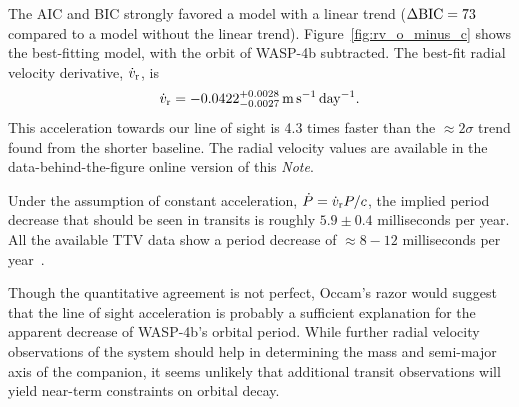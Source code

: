 \documentclass[RNAAS]{aastex62}
\begin{document}
The AIC and BIC strongly favored a model with a linear trend ($\Delta
{\rm BIC}=73$ compared to a model without the linear trend).
Figure~\ref{fig:rv_o_minus_c} shows the best-fitting model, with the
orbit of WASP-4b subtracted.  The best-fit radial velocity derivative,
$\dot{v}_{\rm r}$, is
\begin{equation}
  \dot{v}_{\rm r} = -0.0422^{+0.0028}_{-0.0027}\,{\rm m\,s^{-1}\,day^{-1}}.
\end{equation}
This acceleration towards our line of sight is 4.3 times faster than
the $\approx$$2\sigma$ trend \citet{knutson_friends_2014}
found from the shorter baseline.  The radial velocity values are
available in the data-behind-the-figure online version of this {\it
Note}.

Under the assumption of constant acceleration, $\dot{P} = \dot{v}_{\rm
r} P / c$, the implied period decrease that should be seen in
transits is roughly $5.9 \pm 0.4$ milliseconds per year.  All the
available TTV data show a period decrease of $\approx 8-12$
milliseconds per year~\citep{bouma_wasp-4b_2019,southworth_transit_2019,baluev_homogeneously_2019}.

Though the quantitative agreement is not perfect, Occam's razor would
suggest that the line of sight acceleration is probably a sufficient
explanation for the apparent decrease of WASP-4b's orbital period.
While further radial velocity observations of the system should help
in determining the mass and semi-major axis of the companion, it seems
unlikely that additional transit observations will yield near-term
constraints on orbital decay.


\end{document}
